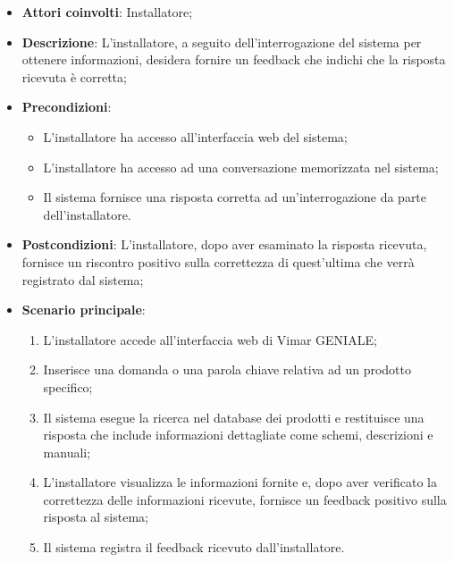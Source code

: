 \begin{itemize}
    \item \textbf{Attori coinvolti}: Installatore;
    \item \textbf{Descrizione}: L’installatore, a seguito dell’interrogazione del sistema per ottenere informazioni, desidera fornire un feedback che indichi che la risposta ricevuta è corretta;
    \item \textbf{Precondizioni}: 
        \begin{itemize}
            \item L’installatore ha accesso all’interfaccia web del sistema;
            \item L’installatore ha accesso ad una conversazione memorizzata nel sistema;
            \item Il sistema fornisce una risposta corretta ad un’interrogazione da parte dell’installatore.
        \end{itemize}
    \item \textbf{Postcondizioni}: L’installatore, dopo aver esaminato la risposta ricevuta, fornisce un riscontro positivo sulla correttezza di quest’ultima che verrà registrato dal sistema;
    \item \textbf{Scenario principale}:
    \begin{enumerate}
    \item L’installatore accede all’interfaccia web di Vimar GENIALE;
    \item Inserisce una domanda o una parola chiave relativa ad un prodotto specifico;
    \item Il sistema esegue la ricerca nel database dei prodotti e restituisce una risposta che include informazioni dettagliate come schemi, descrizioni e manuali;
    \item L’installatore visualizza le informazioni fornite e, dopo aver verificato la correttezza delle informazioni ricevute, fornisce un feedback positivo sulla risposta al sistema;
    \item Il sistema registra il feedback ricevuto dall’installatore.
    \end{enumerate}
\end{itemize}

